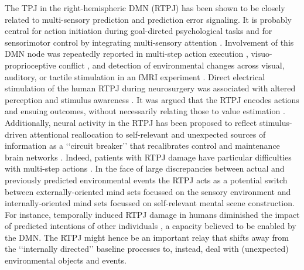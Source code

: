 \documentclass[10pt,letterpaper]{article}
\begin{document}
The TPJ in the right-hemispheric DMN (RTPJ)
has been shown to be closely related to
multi-sensory prediction and prediction error signaling.
It is probably central for
action initiation during goal-dircted psychological tasks and for
sensorimotor control by integrating multi-sensory attention
\citep{corbetta2002control}.
Involvement of this DMN node was repeatedly reported in
multi-step action execution \citep{hartmann2005takes},
visuo-proprioceptive conflict \citep{Balslev2005}, and
detection of environmental changes across
visual, auditory, or tactile stimulation in an fMRI experiment
\citep{downar2000multimodal}.
Direct electrical stimulation of the human
RTPJ during neurosurgery was associated with altered perception
and stimulus awareness \citep{blanke2002neuropsychology}.
%
It was argued that the RTPJ encodes actions and ensuing outcomes,
without necessarily relating those to value estimation
\citep{liljeholm2013neural, hamilton2008action,
jakobs2009effects}.
Additionally, neural activity in the RTPJ has been proposed to reflect
stimulus-driven attentional reallocation to
self-relevant and unexpected sources of information
as a ‘‘circuit breaker’’ that recalibrates control and maintenance brain networks
\citep{bzdok2013tpj, corbettashul2008}.
Indeed, patients with RTPJ damage have particular difficulties
with multi-step actions \citep{hartmann2005takes}.
In the face of large discrepancies between actual and previously predicted
environmental events the RTPJ acts as a potential switch between
externally-oriented mind sets focussed on the
sensory environment and internally-oriented mind sets focussed
on self-relevant mental scene construction.
For instance, temporally induced RTPJ damage in humans diminished the
impact of predicted intentions of other individuals
\citep{young2010disruption},
a capacity believed to be enabled by the DMN.
The RTPJ might hence be an important relay that shifts away
from the ‘‘internally directed’’ baseline processes
to, instead, deal with (unexpected) environmental objects and events.
\end{document}
